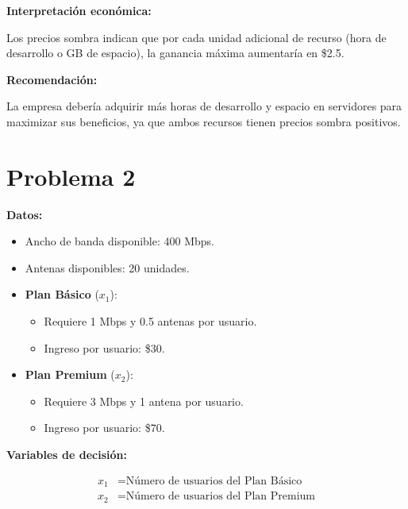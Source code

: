 \documentclass{article}
\begin{document}
\textbf{Interpretación económica:}

Los precios sombra indican que por cada unidad adicional de recurso (hora de desarrollo o GB de espacio), la ganancia máxima aumentaría en \$2.5.

\textbf{Recomendación:}

La empresa debería adquirir más horas de desarrollo y espacio en servidores para maximizar sus beneficios, ya que ambos recursos tienen precios sombra positivos.

\newpage

\section*{Problema 2}

\begin{multicols}{2}
\textbf{Datos:}

\begin{itemize}
    \item Ancho de banda disponible: 400 Mbps.
    \item Antenas disponibles: 20 unidades.
    \item \textbf{Plan Básico} (\( x_1 \)):
    \begin{itemize}
        \item Requiere 1 Mbps y 0.5 antenas por usuario.
        \item Ingreso por usuario: \$30.
    \end{itemize}
    \item \textbf{Plan Premium} (\( x_2 \)):
    \begin{itemize}
        \item Requiere 3 Mbps y 1 antena por usuario.
        \item Ingreso por usuario: \$70.
    \end{itemize}
\end{itemize}

\textbf{Variables de decisión:}

\[
\begin{aligned}
x_1 &= \text{Número de usuarios del Plan Básico} \\
x_2 &= \text{Número de usuarios del Plan Premium}
\end{aligned}
\]
    
\end{multicols}
\end{document}
